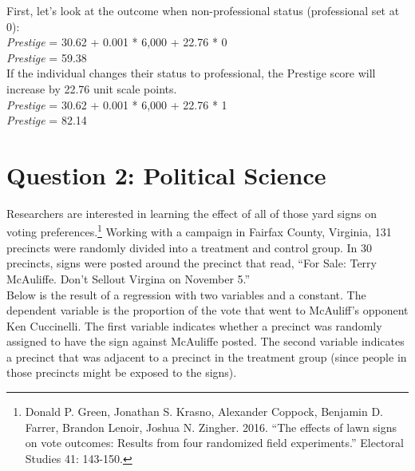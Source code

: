 \documentclass[12pt,letterpaper]{article}
\begin{document}
\begin{enumerate}
	First, let's look at the outcome when non-professional status (professional set at 0):\\
	
	\textit{Prestige} = 30.62 + 0.001 * 6,000 + 22.76 * 0 \\
	\textit{Prestige} = 59.38 \\
	
	If the individual changes their status to professional, the Prestige score will increase by 22.76 unit scale points.\\
	
	\textit{Prestige} = 30.62 + 0.001 * 6,000 + 22.76 * 1 \\
	\textit{Prestige} = 82.14 \\
		
\end{enumerate}

\newpage

\section*{Question 2: Political Science}
\vspace{.25cm}
\noindent 	Researchers are interested in learning the effect of all of those yard signs on voting preferences.\footnote{Donald P. Green, Jonathan	S. Krasno, Alexander Coppock, Benjamin D. Farrer,	Brandon Lenoir, Joshua N. Zingher. 2016. ``The effects of lawn signs on vote outcomes: Results from four randomized field experiments.'' Electoral Studies 41: 143-150. } Working with a campaign in Fairfax County, Virginia, 131 precincts were randomly divided into a treatment and control group. In 30 precincts, signs were posted around the precinct that read, ``For Sale: Terry McAuliffe. Don't Sellout Virgina on November 5.'' \\

Below is the result of a regression with two variables and a constant.  The dependent variable is the proportion of the vote that went to McAuliff's opponent Ken Cuccinelli. The first variable indicates whether a precinct was randomly assigned to have the sign against McAuliffe posted. The second variable indicates
a precinct that was adjacent to a precinct in the treatment group (since people in those precincts might be exposed to the signs).  \\
\end{document}

